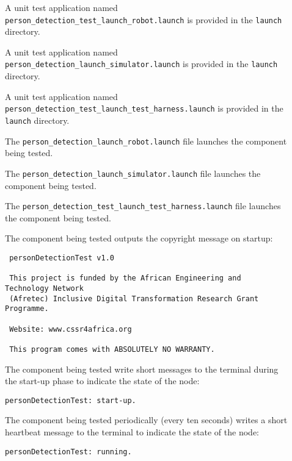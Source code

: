\documentclass{CSSRforAfrica}
\newcommand{\checkboxChecked}{\fbox{\ding{51}}} %
\newcommand{\checkboxDashed}{\fbox{--}}         %
\begin{document}
\begin{description}

\item[\checkboxChecked] A unit test application named {\small \verb+person_detection_test_launch_robot.launch+} is provided in the {\small \verb+launch+} directory.

\item[\checkboxDashed] A unit test application named {\small \verb+person_detection_launch_simulator.launch+} is provided in the {\small \verb+launch+} directory.

\item[\checkboxChecked] A unit test application named {\small \verb+person_detection_test_launch_test_harness.launch+} is provided in the {\small \verb+launch+} directory.

\item[\checkboxChecked] The {\small \verb+person_detection_launch_robot.launch+} file launches the component being tested.

\item[\checkboxDashed] The {\small \verb+person_detection_launch_simulator.launch+} file launches the component being tested.

\item[\checkboxChecked] The {\small \verb+person_detection_test_launch_test_harness.launch+} file launches the component being tested.

\item[\checkboxChecked] The component being tested outputs the copyright message on startup:
{\small 
\begin{verbatim}
 personDetectionTest v1.0
 
 This project is funded by the African Engineering and Technology Network 
 (Afretec) Inclusive Digital Transformation Research Grant Programme.
 
 Website: www.cssr4africa.org
 
 This program comes with ABSOLUTELY NO WARRANTY.
\end{verbatim}}

\item[\checkboxChecked]  The component being tested write short messages to the terminal during the start-up phase to indicate the state of the node:
{\small 
\begin{verbatim}
personDetectionTest: start-up.
\end{verbatim}}

\item[\checkboxChecked]   The component being tested periodically (every ten seconds) writes a short heartbeat message to the terminal to indicate the state of the node:
{\small 
\begin{verbatim}
personDetectionTest: running.
\end{verbatim}}


\end{description}
\end{document}
